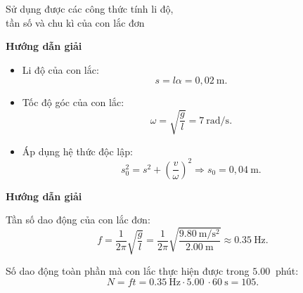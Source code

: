 \begin{dang}{Sử dụng được các công thức tính li độ,\\ tần số và chu kì của con lắc đơn}
	{\begin{center}
			\textbf{Hướng dẫn giải}
		\end{center}
		
		\begin{itemize}
			\item Li độ của con lắc:
			\begin{equation*}
				s = l \alpha = 0,02\ \text{m}. 
			\end{equation*}
			\item Tốc độ góc của con lắc:
			\begin{equation*}
				\omega = \sqrt{\dfrac{g}{l}} = 7\ \text{rad/s}.
			\end{equation*}
			\item Áp dụng hệ thức độc lập:
			\begin{equation*}
				s^2_0 =s^2+\left(\dfrac{v}{\omega}\right)^2 \Rightarrow s_0 = 0,04\ \text{m}.
			\end{equation*}
		\end{itemize}
	}
	{\begin{center}
			\textbf{Hướng dẫn giải}
		\end{center}
		
		Tần số dao động của con lắc đơn:
		$$f=\dfrac {1}{2\pi} \sqrt {\dfrac{g}{l}} = \dfrac {1}{2\pi} \sqrt {\dfrac{\SI{9.80}{\meter / \second ^2}}{\SI{2.00}{\meter}}} \approx \SI{0.35}{\hertz}.$$
		
		Số dao động toàn phần mà con lắc thực hiện được trong $\SI{5.00}{}$ phút:
		$$N=ft =\SI{0.35}{\hertz} \cdot \SI{5.00}{}\cdot \SI{60}{\second} = 105.$$
	}
	
\end{dang}

